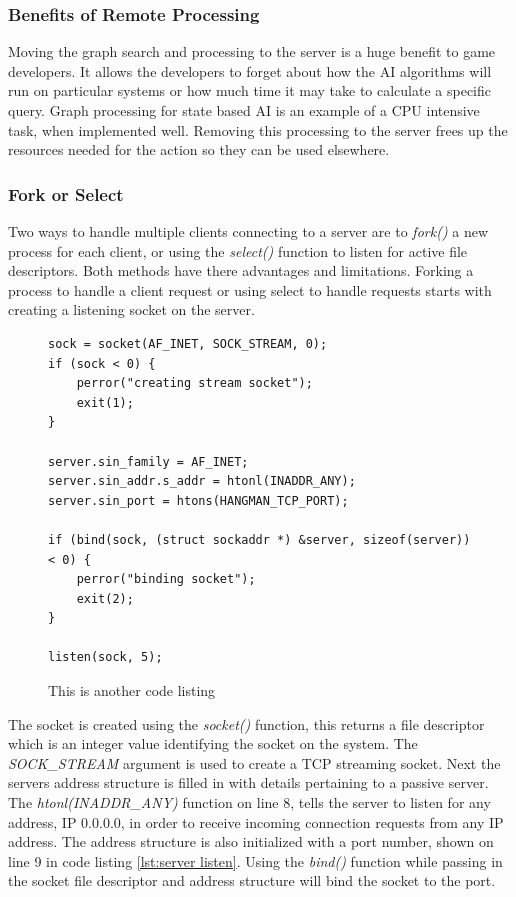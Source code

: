 \documentclass[12pt,a4paper,titlepage]{article}
\begin{document}
\subsubsection{Benefits of Remote Processing}

Moving the graph search and processing to the server is a huge benefit to game developers. It allows the developers to forget about how the AI algorithms will run on particular systems or how much time it may take to calculate a specific query. Graph processing for state based AI is an example of a CPU intensive task, when implemented well. Removing this processing to the server frees up the resources needed for the action so they can be used elsewhere.\\


\subsubsection{Fork or Select}

Two ways to handle multiple clients connecting to a server are to \textit{fork()} a new process for each client, or using the \textit{select()} function to listen for active file descriptors. Both methods have there advantages and limitations. Forking a process to handle a client request or using select to handle requests starts with creating a listening socket on the server. 

\begin{figure}[H]

\begin{lstlisting}
sock = socket(AF_INET, SOCK_STREAM, 0); 
if (sock < 0) {
	perror("creating stream socket");
	exit(1);
}

server.sin_family = AF_INET;
server.sin_addr.s_addr = htonl(INADDR_ANY);
server.sin_port = htons(HANGMAN_TCP_PORT);

if (bind(sock, (struct sockaddr *) &server, sizeof(server)) < 0) {
	perror("binding socket");
	exit(2);
}

listen(sock, 5);
\end{lstlisting}
	\caption{This is another code listing \cite{stevensunp}}
	\label{code:raig header source}
\end{figure}

The socket is created using the \textit{socket()} function, this returns a file descriptor which is an integer value identifying the socket on the system. The \textit{SOCK\_STREAM} argument is used to create a TCP streaming socket. Next the servers address structure is filled in with details pertaining to a passive server. The \textit{htonl(INADDR\_ANY)} function on line 8, tells the server to listen for any address, IP 0.0.0.0, in order to receive incoming connection requests from any IP address. The address structure is also initialized with a port number, shown on line 9 in code listing \ref{lst:server listen}. Using the \textit{bind()} function while passing in the socket file descriptor and address structure will bind the socket to the port.\\ 
\end{document}
